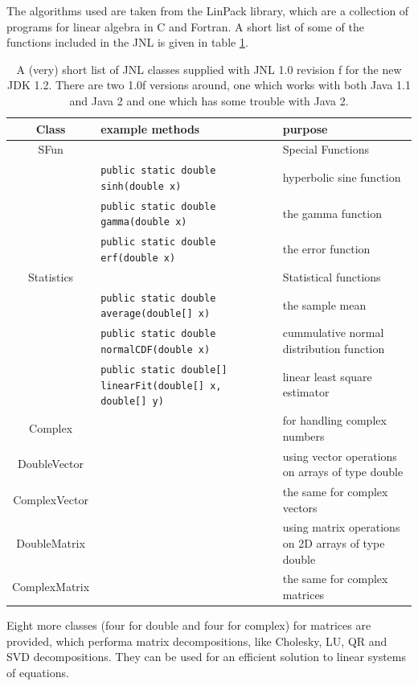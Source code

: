 The algorithms used are taken from the LinPack library, which
are a collection of programs for linear algebra in C and Fortran.
A short list of some of the functions included in the JNL is
given in table \ref{tab:JNL}.
\begin{table}[htbp]
  \begin{center}
    \begin{tabular}{c||l|l}
      Class  & example methods & purpose \\\hline\hline
      SFun &  & Special Functions \\
           & \verb|public static double sinh(double x)| & hyperbolic sine function \\
           & \verb|public static double gamma(double x)| & the gamma function \\
           & \verb|public static double erf(double x)| & the error function \\\hline
      Statistics &  & Statistical functions \\
           & \verb|public static double average(double[] x)| & the sample mean\\
           & \verb|public static double normalCDF(double x)| & 
                             cummulative normal distribution function\\
           & \verb|public static double[] linearFit(double[] x, double[] y)| &
                             linear least square estimator \\\hline
      Complex &  & for handling complex numbers \\\hline
      DoubleVector &  & using vector operations on arrays of type double\\
      ComplexVector & & the same for complex vectors \\\hline 
      DoubleMatrix &  & using matrix operations on 2D arrays of type double\\
      ComplexMatrix & & the same for complex matrices \\\hline 
    \end{tabular}
    \caption{A (very) short list of JNL classes supplied with JNL 1.0 revision f for the new JDK 1.2. There are two 1.0f versions around, one which works with both Java 1.1 and Java 2 and one which has some trouble with Java 2.}
    \label{tab:JNL}
  \end{center}
\end{table}
Eight more classes (four for double and four for complex) for
matrices are provided, which performa matrix decompositions,
like Cholesky, LU, QR and SVD decompositions. They can be
used for an efficient solution to linear systems of equations.
 
